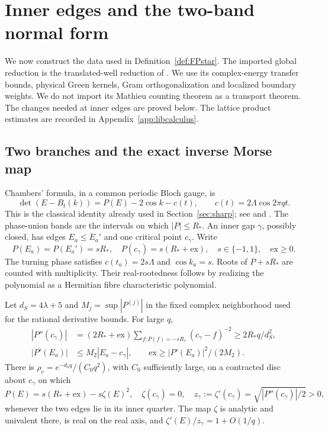 \section{Inner edges and the two-band normal form}\label{sec:innerframes}

We now construct the data used in Definition~\ref{def:FPstar}.
The imported global reduction is the translated-well reduction of
\cite[Appendices A--D]{DMband}. We use its complex-energy transfer
bounds, physical Green kernels, Gram orthogonalization and localized
boundary weights. We do not import its Mathieu counting theorem as
a transport theorem. The changes needed at inner edges are proved
below. The lattice product estimates are recorded in
Appendix~\ref{app:libcalculus}.

\subsection{Two branches and the exact inverse Morse map}

Chambers' formula, in a common periodic Bloch gauge, is
\begin{equation}\label{eq:libchambers}
 \det(E-B_t(k))=P(E)-2\cos k-c(t),\qquad
 c(t)=2\Lambda\cos2\pi qt.
\end{equation}
This is the classical identity already used in
Section~\ref{sec:sharp}; see \cite{Chambers1965} and
\cite[Methods and conventions]{DMband}.
The phase-union bands are the intervals on which $|P|\le R_*$.
An inner gap $\gamma$, possibly closed, has edges $E_a\le E_a'$ and
one critical point $c_\gamma$. Write
\[
 P(E_a)=P(E_a')=sR_*,\quad
 P(c_\gamma)=s(R_*+\mathrm{ex}),\quad s\in\{-1,1\},\quad
 \mathrm{ex}\ge0.
\]
The turning phase satisfies $c(t_a)=2s\Lambda$ and
$\cos k_a=s$. Roots of $P+sR_*$ are counted with multiplicity.
Their real-rootedness follows by realizing the polynomial as a
Hermitian fibre characteristic polynomial.

\begin{lemma}\label{lem:libMorse}
Let $d_S=4\lambda+5$ and $M_j=\sup|P^{(j)}|$ in the fixed complex
neighborhood used for the rational derivative bounds. For large $q$,
\begin{align}
 |P''(c_\gamma)|&=(2R_*+\mathrm{ex})
       \sum_{f:P(f)=-sR_*}(c_\gamma-f)^{-2}
       \ge 2R_*q/d_S^2,\label{eq:libcurvature}\\
 |P'(E_a)|&\le M_2|E_a-c_\gamma|,\qquad
 \mathrm{ex}\ge |P'(E_a)|^2/(2M_2).\label{eq:libexcess}
\end{align}
There is $\rho_c=e^{-d_hq}/(C_0q^2)$, with $C_0$ sufficiently large,
on a contracted disc about $c_\gamma$ on which
\begin{equation}\label{eq:libMorse}
 P(E)=s(R_*+\mathrm{ex})-s\zeta(E)^2,\quad
 \zeta(c_\gamma)=0,\quad z_\gamma:=\zeta'(c_\gamma)
      =\sqrt{|P''(c_\gamma)|/2}>0,
\end{equation}
whenever the two edges lie in its inner quarter.
The map $\zeta$ is analytic and univalent there, is real on the real
axis, and $\zeta'(E)/z_\gamma=1+O(1/q)$.
\end{lemma}

